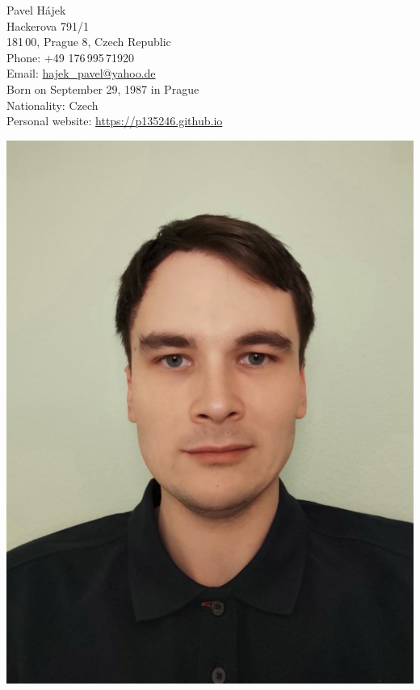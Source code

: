 \documentclass[a4paper,12pt]{article}
\begin{document}
%
%
\begin{minipage}[t]{.7\textwidth}
	{\Large Pavel H\'ajek}\\[.2cm]
	Hackerova 791/1\\
	181\,00, Prague 8, Czech Republic \\[.2cm]
	Phone: +49 176\,995\,71920\\
	Email: \href{mailto:hajek_pavel@yahoo.de}{hajek\_pavel@yahoo.de}\\[.2cm]	
	Born on September 29, 1987 in Prague\\
	Nationality:  Czech\\[.2cm]
	Personal website: \href{https://p135246.github.io}{https://p135246.github.io}
\end{minipage}
\hfill
\includegraphics[scale=0.13,valign=t]{./graphics/me-120121.jpeg}
%
\end{document}

